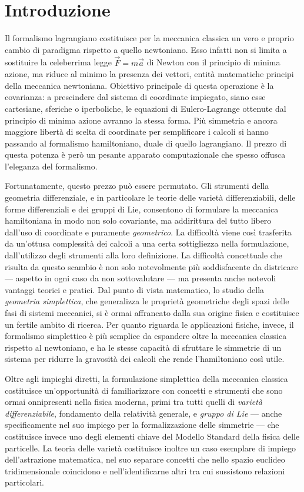 \chapter*{Introduzione} 

Il formalismo lagrangiano costituisce per la meccanica classica un vero e proprio cambio di paradigma rispetto a quello newtoniano. Esso infatti non si limita a sostituire la celeberrima legge $\vec{F}=m\vec{a}$ di Newton con il principio di minima azione, ma riduce al minimo la presenza dei vettori, entità matematiche principi della meccanica newtoniana. Obiettivo principale di questa operazione è la covarianza: a prescindere dal sistema di coordinate impiegato, siano esse cartesiane, sferiche o iperboliche, le equazioni di Eulero-Lagrange ottenute dal principio di minima azione avranno la stessa forma. Più simmetria e ancora maggiore libertà di scelta di coordinate per semplificare i calcoli si hanno passando al formalismo hamiltoniano, duale di quello lagrangiano. Il prezzo di questa potenza è però un pesante apparato computazionale che spesso offusca l'eleganza del formalismo.

Fortunatamente, questo prezzo può essere permutato. Gli strumenti della geometria differenziale, e in particolare le teorie delle varietà differenziabili, delle forme differenziali e dei gruppi di Lie, consentono di formulare la meccanica hamiltoniana in modo non solo covariante, ma addirittura del tutto libero dall'uso di coordinate e puramente \emph{geometrico}. La difficoltà viene così trasferita da un'ottusa complessità dei calcoli a una certa sottigliezza nella formulazione, dall'utilizzo degli strumenti alla loro definizione. La difficoltà concettuale che risulta da questo scambio è non solo notevolmente più soddisfacente da districare --- aspetto in ogni caso da non sottovalutare --- ma presenta anche notevoli vantaggi teorici e pratici. Dal punto di vista matematico, lo studio della \emph{geometria simplettica}, che generalizza le proprietà geometriche degli spazi delle fasi di sistemi meccanici, si è ormai affrancato dalla sua origine fisica e costituisce un fertile ambito di ricerca. Per quanto riguarda le applicazioni fisiche, invece, il formalismo simplettico è più semplice da espandere oltre la meccanica classica rispetto al newtoniano, e ha le stesse capacità di sfruttare le simmetrie di un sistema per ridurre la gravosità dei calcoli che rende l'hamiltoniano così utile.

Oltre agli impieghi diretti, la formulazione simplettica della meccanica classica costituisce un'opportunità di familiarizzare con concetti e strumenti che sono ormai onnipresenti nella fisica moderna, primi tra tutti quelli di \emph{varietà differenziabile}, fondamento della relatività generale, e \emph{gruppo di Lie} --- anche specificamente nel suo impiego per la formalizzazione delle simmetrie --- che costituisce invece uno degli elementi chiave del Modello Standard della fisica delle particelle. La teoria delle varietà costituisce inoltre un caso esemplare di impiego dell'astrazione matematica, nel suo separare concetti che nello spazio euclideo tridimensionale coincidono e nell'identificarne altri tra cui sussistono relazioni particolari.

